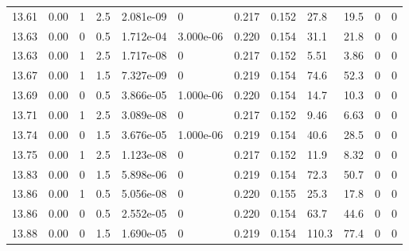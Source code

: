 \documentclass[preview]{standalone}
\begin{document}
{{{{{{\begin{tabular}{L{1.2cm}C{1.2cm} C{0.3cm}C{0.5cm} C{1.4cm}C{1.4cm} C{1.4cm}C{1.4cm} C{1.6cm}C{1.6cm} C{1.6cm}C{1.6cm}}
  13.61  &  0.00  & 1     & 2.5 &  2.081e-09  & 0  &  0.217&   0.152& 27.8 & 19.5   &  0 & 0  \\ 
  13.63  &  0.00  & 0     & 0.5 &  1.712e-04  & 3.000e-06  &  0.220&   0.154& 31.1 & 21.8   &  0 & 0  \\ 
  13.63  &  0.00  & 1     & 2.5 &  1.717e-08  & 0  &  0.217&   0.152& 5.51 & 3.86   &  0 & 0  \\ 
  13.67  &  0.00  & 1     & 1.5 &  7.327e-09  & 0  &  0.219&   0.154& 74.6 & 52.3   &  0 & 0  \\ 
  13.69  &  0.00  & 0     & 0.5 &  3.866e-05  & 1.000e-06  &  0.220&   0.154& 14.7 & 10.3   &  0 & 0  \\ 
  13.71  &  0.00  & 1     & 2.5 &  3.089e-08  & 0  &  0.217&   0.152& 9.46 & 6.63   &  0 & 0  \\ 
  13.74  &  0.00  & 0     & 1.5 &  3.676e-05  & 1.000e-06  &  0.219&   0.154& 40.6 & 28.5   &  0 & 0  \\ 
  13.75  &  0.00  & 1     & 2.5 &  1.123e-08  & 0  &  0.217&   0.152& 11.9 & 8.32   &  0 & 0  \\ 
  13.83  &  0.00  & 0     & 1.5 &  5.898e-06  & 0  &  0.219&   0.154& 72.3 & 50.7   &  0 & 0  \\ 
  13.86  &  0.00  & 1     & 0.5 &  5.056e-08  & 0  &  0.220&   0.155& 25.3 & 17.8   &  0 & 0  \\ 
  13.86  &  0.00  & 0     & 0.5 &  2.552e-05  & 0  &  0.220&   0.154& 63.7 & 44.6   &  0 & 0  \\ 
  13.88  &  0.00  & 0     & 1.5 &  1.690e-05  & 0  &  0.219&   0.154& 110.3 & 77.4   &  0 & 0  \\ 
\hline 
\end{tabular} 

}}}}}}
\end{document}
